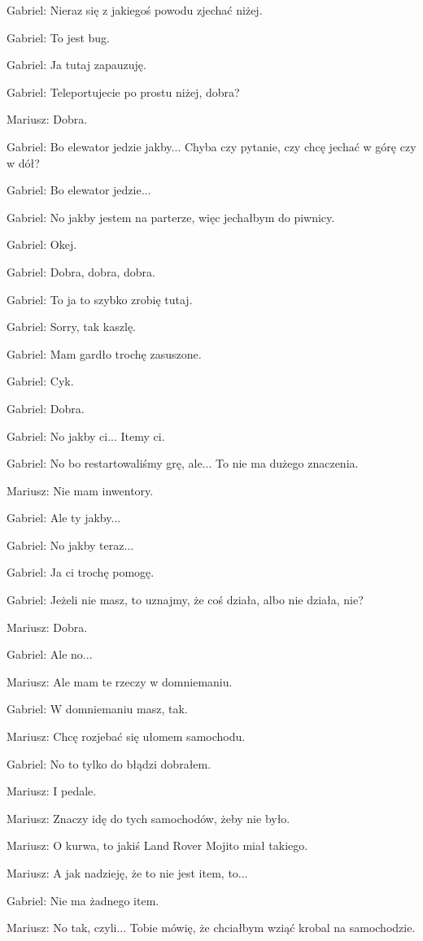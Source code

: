 Gabriel: Nieraz się z jakiegoś powodu zjechać niżej.

Gabriel: To jest bug.

Gabriel: Ja tutaj zapauzuję.

Gabriel: Teleportujecie po prostu niżej, dobra?

Mariusz: Dobra.

Gabriel: Bo elewator jedzie jakby... Chyba czy pytanie, czy chcę jechać w górę czy w dół?

Gabriel: Bo elewator jedzie...

Gabriel: No jakby jestem na parterze, więc jechałbym do piwnicy.

Gabriel: Okej.

Gabriel: Dobra, dobra, dobra.

Gabriel: To ja to szybko zrobię tutaj.

Gabriel: Sorry, tak kaszlę.

Gabriel: Mam gardło trochę zasuszone.

Gabriel: Cyk.

Gabriel: Dobra.

Gabriel: No jakby ci... Itemy ci.

Gabriel: No bo restartowaliśmy grę, ale... To nie ma dużego znaczenia.

Mariusz: Nie mam inwentory.

Gabriel: Ale ty jakby...

Gabriel: No jakby teraz...

Gabriel: Ja ci trochę pomogę.

Gabriel: Jeżeli nie masz, to uznajmy, że coś działa, albo nie działa, nie?

Mariusz: Dobra.

Gabriel: Ale no...

Mariusz: Ale mam te rzeczy w domniemaniu.

Gabriel: W domniemaniu masz, tak.

Mariusz: Chcę rozjebać się ułomem samochodu.

Gabriel: No to tylko do błądzi dobrałem.

Mariusz: I pedale.

Mariusz: Znaczy idę do tych samochodów, żeby nie było.

Mariusz: O kurwa, to jakiś Land Rover Mojito miał takiego.

Mariusz: A jak nadzieję, że to nie jest item, to...

Gabriel: Nie ma żadnego item.

Mariusz: No tak, czyli... Tobie mówię, że chciałbym wziąć krobal na samochodzie.

